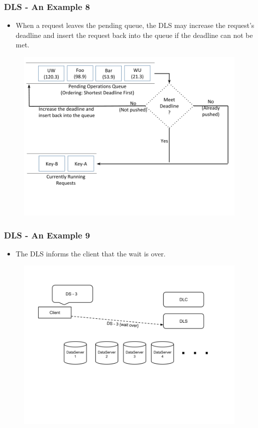 \documentclass{beamer}
\begin{document}
\begin{frame}
  \frametitle{DLS - An Example 8}
  \begin{itemize}
    \item When a request leaves the pending queue, the DLS may increase the
      request's deadline and insert the request back into the queue if the
      deadline can not be met.
  \end{itemize}
  \begin{figure}
    \begin{center}
      \centerline{\includegraphics[scale=0.35]{img/DLS_Example9.png}}
    \end{center}
  \end{figure}
\end{frame}

\begin{frame}
  \frametitle{DLS - An Example 9}
  \begin{itemize}
  \item The DLS informs the client that the wait is over.
  \end{itemize}
  \begin{figure}
    \begin{center}
      \centerline{\includegraphics[scale=0.35]{img/DLS_Example10.png}}
    \end{center}
  \end{figure}
\end{frame}
\end{document}
